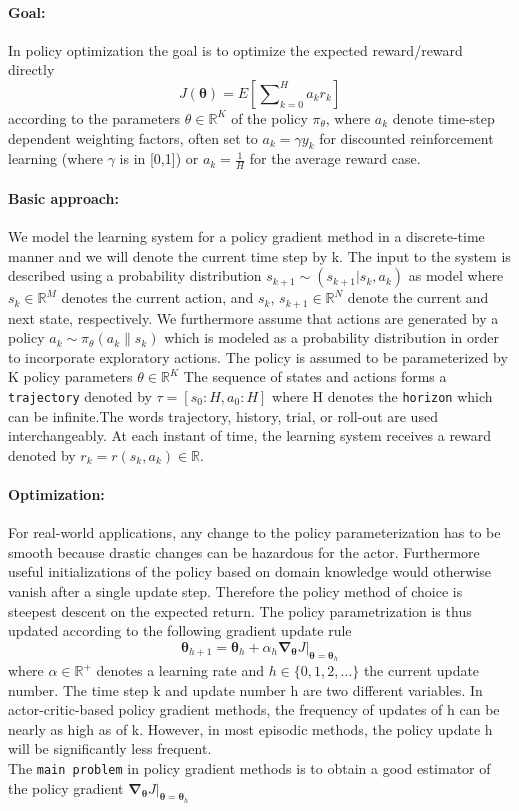 \documentclass[11pt]{article}
\begin{document}
\paragraph{Goal:} In policy optimization the goal is to optimize the expected reward/reward directly \[
J\left(\mathbf{\theta}\right)=E\left[\sum\nolimits_{k=0}^{H}a_{k}r_{k}\right]
\]
according to the parameters $\theta \in \mathbb{R}^K$ of the policy $\pi_\theta$, where $a_k$ denote time-step dependent weighting factors, often set to $a_k=\gamma y_k$ for discounted reinforcement learning (where $\gamma$ is in [0,1]) or $a_k=\frac{1}{H}$ for the average reward case.

\paragraph{Basic approach:}
We model the learning system for a policy gradient method in a discrete-time manner and we will denote the current time step by k. The input to the system is described using a probability distribution $s_{k+1}\sim (s_{k+1}|s_k,a_k)$ as model where $s_k \in \mathbb{R}^M$ denotes the current action, and $s_k$, $s_{k+1}\in \mathbb{R}^N$ denote the current and next state, respectively.
We furthermore assume that actions are generated by a policy $a_k \sim \pi_\theta(a_k\|s_k)$ which is modeled as a probability distribution in order to incorporate exploratory actions. The policy is assumed to be parameterized by K policy parameters $\theta \in \mathbb{R}^K$ 
The sequence of states and actions forms a \texttt{trajectory} denoted by $\tau=[s_0:H,a_0:H]$ where H denotes the \texttt{horizon} which can be infinite.The words trajectory, history, trial, or roll-out are used interchangeably. At each instant of time, the learning system receives a reward denoted by $r_k=r(s_k,a_k)\in \mathbb{R}$.

\paragraph{Optimization:} For real-world applications, any change to the policy parameterization has to be smooth because drastic changes can be hazardous for the actor. Furthermore useful initializations of the policy based on domain knowledge would otherwise vanish after a single update step. Therefore the policy method of choice is steepest descent on the expected return. The policy parametrization is thus updated according to the following gradient update rule
\[
\mathbf{\theta}_{h+1}=\mathbf{\theta}_{h}+\alpha_{h}\mathbf{\nabla
}_{\mathbf{\theta}}J\vert _{\mathbf{\theta}=\mathbf{\theta}_{h}}
\]
where $\alpha \in \mathbb{R}^+$ denotes a learning rate and $h \in \{0,1,2,\dots\}$ the current update number. The time step k and update number h are two different variables. In actor-critic-based policy gradient methods, the frequency of updates of h can be nearly as high as of k. However, in most episodic methods, the policy update h will be significantly less frequent.\\
The \texttt{main problem} in policy gradient methods is to obtain a good estimator of the policy gradient $\mathbf{\nabla}_{\mathbf{\theta}}J\vert
_{\mathbf{\theta}=\mathbf{\theta}_{h}}$
\end{document}
